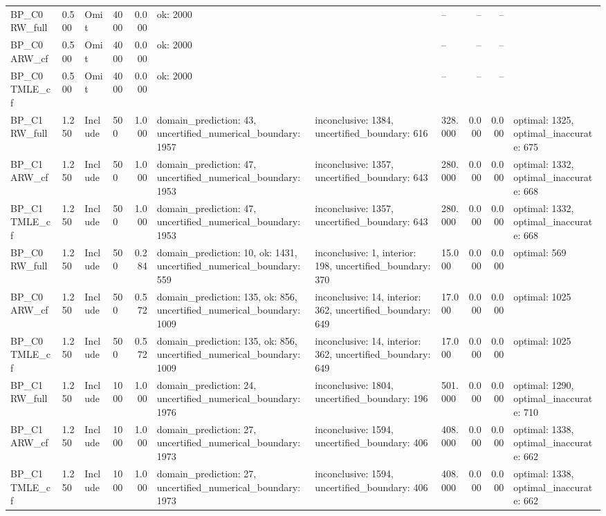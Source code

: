 \begin{tabular}{llllrlllrrl}
BP\_C0 RW\_full & 0.500 & Omit & 4000 & 0.000 & ok: 2000 &  & -- & -- & -- &  \\
BP\_C0 ARW\_cf & 0.500 & Omit & 4000 & 0.000 & ok: 2000 &  & -- & -- & -- &  \\
BP\_C0 TMLE\_cf & 0.500 & Omit & 4000 & 0.000 & ok: 2000 &  & -- & -- & -- &  \\
BP\_C1 RW\_full & 1.250 & Include & 500 & 1.000 & domain\_prediction: 43, uncertified\_numerical\_boundary: 1957 & inconclusive: 1384, uncertified\_boundary: 616 & 328.000 & 0.000 & 0.000 & optimal: 1325, optimal\_inaccurate: 675 \\
BP\_C1 ARW\_cf & 1.250 & Include & 500 & 1.000 & domain\_prediction: 47, uncertified\_numerical\_boundary: 1953 & inconclusive: 1357, uncertified\_boundary: 643 & 280.000 & 0.000 & 0.000 & optimal: 1332, optimal\_inaccurate: 668 \\
BP\_C1 TMLE\_cf & 1.250 & Include & 500 & 1.000 & domain\_prediction: 47, uncertified\_numerical\_boundary: 1953 & inconclusive: 1357, uncertified\_boundary: 643 & 280.000 & 0.000 & 0.000 & optimal: 1332, optimal\_inaccurate: 668 \\
BP\_C0 RW\_full & 1.250 & Include & 500 & 0.284 & domain\_prediction: 10, ok: 1431, uncertified\_numerical\_boundary: 559 & inconclusive: 1, interior: 198, uncertified\_boundary: 370 & 15.000 & 0.000 & 0.000 & optimal: 569 \\
BP\_C0 ARW\_cf & 1.250 & Include & 500 & 0.572 & domain\_prediction: 135, ok: 856, uncertified\_numerical\_boundary: 1009 & inconclusive: 14, interior: 362, uncertified\_boundary: 649 & 17.000 & 0.000 & 0.000 & optimal: 1025 \\
BP\_C0 TMLE\_cf & 1.250 & Include & 500 & 0.572 & domain\_prediction: 135, ok: 856, uncertified\_numerical\_boundary: 1009 & inconclusive: 14, interior: 362, uncertified\_boundary: 649 & 17.000 & 0.000 & 0.000 & optimal: 1025 \\
BP\_C1 RW\_full & 1.250 & Include & 1000 & 1.000 & domain\_prediction: 24, uncertified\_numerical\_boundary: 1976 & inconclusive: 1804, uncertified\_boundary: 196 & 501.000 & 0.000 & 0.000 & optimal: 1290, optimal\_inaccurate: 710 \\
BP\_C1 ARW\_cf & 1.250 & Include & 1000 & 1.000 & domain\_prediction: 27, uncertified\_numerical\_boundary: 1973 & inconclusive: 1594, uncertified\_boundary: 406 & 408.000 & 0.000 & 0.000 & optimal: 1338, optimal\_inaccurate: 662 \\
BP\_C1 TMLE\_cf & 1.250 & Include & 1000 & 1.000 & domain\_prediction: 27, uncertified\_numerical\_boundary: 1973 & inconclusive: 1594, uncertified\_boundary: 406 & 408.000 & 0.000 & 0.000 & optimal: 1338, optimal\_inaccurate: 662 \\

\end{tabular}
